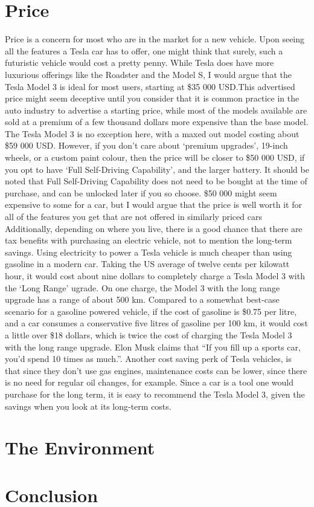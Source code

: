 \documentclass{article}
\begin{document}
  \section{Price}
  Price is a concern for most who are in the market for a new vehicle. Upon seeing
  all the features a Tesla car has to offer, one might think that surely,
  such a futuristic vehicle would cost a pretty penny. While Tesla does have
  more luxurious offerings like the Roadster and the Model S, I would argue that the
  Tesla Model 3 is ideal for most users, starting at \$35 000 USD.\@ This advertised
  price might seem deceptive until you consider that it is common practice
  in the auto industry to advertise a starting price, while most of the models available
  are sold at a premium of a few thousand dollars more expensive than the base model. The
  Tesla Model 3 is no exception here, with a maxed out model costing about
  \$59 000 USD\cite{maxprice}. However, if you don't care about `premium upgrades',
  19-inch wheels, or a custom paint colour, then the price will be closer to
  \$50 000 USD, if you opt to have `Full Self-Driving Capability', and the larger
  battery. It should be noted that Full Self-Driving Capability does not need to be
  bought at the time of purchase, and can be unlocked later if you so choose.
  \$50 000 might seem expensive to some for a car, but I would argue that the price is well worth
  it for all of the features you get that are not offered in similarly priced cars
  Additionally, depending on where you live, there is a good chance that there are
  tax benefits with purchasing an electric vehicle, not to mention the long-term savings.
  Using electricity to power a Tesla vehicle is much cheaper than using gasoline in
  a modern car. Taking the US average of twelve cents per kilowatt hour, it would
  cost about nine dollars to completely charge a Tesla Model 3 with the `Long Range'
  ugrade. On one charge, the Model 3 with the long range upgrade has a range of about
  500 km\cite{500km}. Compared to a somewhat best-case scenario for a gasoline powered vehicle,
  if the cost of gasoline is \$0.75 per litre\cite{75cents}, and a car consumes a conservative five
  litres of gasoline per 100 km\cite{priusmpg}, it would cost a little over \$18 dollars, which is
  twice the cost of charging the Tesla Model 3 with the long range upgrade. Elon Musk claims that
  ``If you fill up a sports car, you'd spend 10 times as much.''\cite{rosoff_elon_nodate}. Another cost
  saving perk of Tesla vehicles, is that since they don't use gas engines, maintenance costs
  can be lower, since there is no need for regular oil changes, for example.\cite{oilchange}
  Since a car is a tool one would purchase for the long term, it is easy to
  recommend the Tesla Model 3, given the savings when you look at its long-term costs.

  \section{The Environment}
  \blindtext{}\blindtext{}

  \section{Conclusion}
  \blindtext{}\blindtext{}


\end{document}

